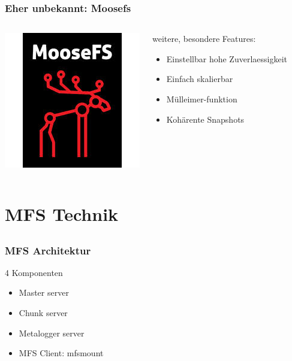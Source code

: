 \documentclass{beamer}
\begin{document}
\begin{frame}
	\frametitle{Eher unbekannt: Moosefs}
	\begin{columns}	
	\includegraphics[scale=0.5]{moosefs.jpg}
	\begin{block}{weitere, besondere Features:}
		\begin{itemize}
			\item Einstellbar hohe Zuverlaessigkeit
			\item Einfach skalierbar
			\item \glqq M\"ulleimer\grqq -funktion
			\item Koh\"arente Snapshots
		\end{itemize}
	\end{block}	
	\end{columns}
\end{frame}



\section{MFS Technik}
\subsection*{}
		
\begin{frame}
	\frametitle{MFS Architektur}
	\begin{block}{4 Komponenten}
	\begin{itemize}
		\item Master server
		\item Chunk server
		\item Metalogger server
		\item MFS Client: mfsmount
	\end{itemize}
	\end{block}
\end{frame}
\end{document}
